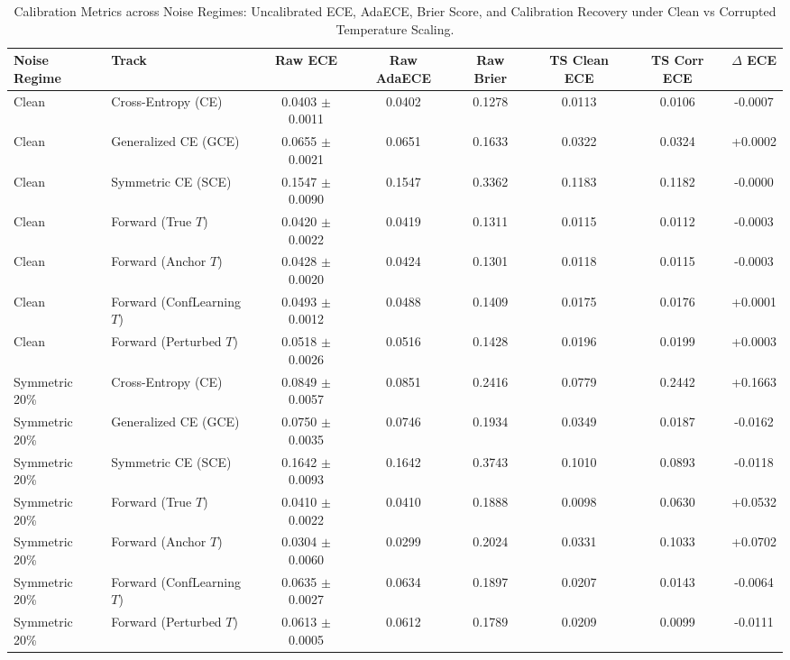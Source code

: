 \begin{table}[t]
\centering
\caption{Calibration Metrics across Noise Regimes: Uncalibrated ECE, AdaECE, Brier Score, and Calibration Recovery under Clean vs Corrupted Temperature Scaling.}
\label{tab:calibration}
\footnotesize
\begin{tabular}{llcccccc}
\hline
\textbf{Noise Regime} & \textbf{Track} & \textbf{Raw ECE} & \textbf{Raw AdaECE} & \textbf{Raw Brier} & \textbf{TS Clean ECE} & \textbf{TS Corr ECE} & \textbf{$\Delta$ ECE} \\
\hline
Clean & Cross-Entropy (CE) & 0.0403 $\pm$ 0.0011 & 0.0402 & 0.1278 & 0.0113 & 0.0106 & -0.0007 \\
Clean & Generalized CE (GCE) & 0.0655 $\pm$ 0.0021 & 0.0651 & 0.1633 & 0.0322 & 0.0324 & +0.0002 \\
Clean & Symmetric CE (SCE) & 0.1547 $\pm$ 0.0090 & 0.1547 & 0.3362 & 0.1183 & 0.1182 & -0.0000 \\
Clean & Forward (True $T$) & 0.0420 $\pm$ 0.0022 & 0.0419 & 0.1311 & 0.0115 & 0.0112 & -0.0003 \\
Clean & Forward (Anchor $T$) & 0.0428 $\pm$ 0.0020 & 0.0424 & 0.1301 & 0.0118 & 0.0115 & -0.0003 \\
Clean & Forward (ConfLearning $T$) & 0.0493 $\pm$ 0.0012 & 0.0488 & 0.1409 & 0.0175 & 0.0176 & +0.0001 \\
Clean & Forward (Perturbed $T$) & 0.0518 $\pm$ 0.0026 & 0.0516 & 0.1428 & 0.0196 & 0.0199 & +0.0003 \\
\hline
Symmetric 20\% & Cross-Entropy (CE) & 0.0849 $\pm$ 0.0057 & 0.0851 & 0.2416 & 0.0779 & 0.2442 & +0.1663 \\
Symmetric 20\% & Generalized CE (GCE) & 0.0750 $\pm$ 0.0035 & 0.0746 & 0.1934 & 0.0349 & 0.0187 & -0.0162 \\
Symmetric 20\% & Symmetric CE (SCE) & 0.1642 $\pm$ 0.0093 & 0.1642 & 0.3743 & 0.1010 & 0.0893 & -0.0118 \\
Symmetric 20\% & Forward (True $T$) & 0.0410 $\pm$ 0.0022 & 0.0410 & 0.1888 & 0.0098 & 0.0630 & +0.0532 \\
Symmetric 20\% & Forward (Anchor $T$) & 0.0304 $\pm$ 0.0060 & 0.0299 & 0.2024 & 0.0331 & 0.1033 & +0.0702 \\
Symmetric 20\% & Forward (ConfLearning $T$) & 0.0635 $\pm$ 0.0027 & 0.0634 & 0.1897 & 0.0207 & 0.0143 & -0.0064 \\
Symmetric 20\% & Forward (Perturbed $T$) & 0.0613 $\pm$ 0.0005 & 0.0612 & 0.1789 & 0.0209 & 0.0099 & -0.0111 \\

\end{tabular}
\end{table}
